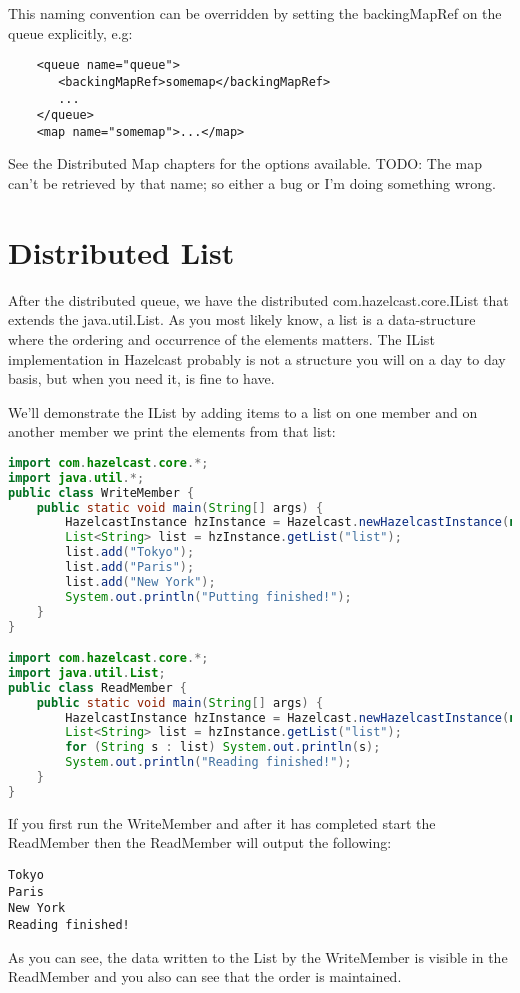 This naming convention can be overridden by setting the backingMapRef on the queue explicitly, e.g:
\begin{lstlisting}
    <queue name="queue">
       <backingMapRef>somemap</backingMapRef>
       ... 
    </queue>
    <map name="somemap">...</map>
\end{lstlisting}
See the Distributed Map chapters for the options available.
TODO: The map can't be retrieved by that name; so either a bug or I'm doing something wrong.

\section{Distributed List}
After the distributed queue, we have the distributed com.hazelcast.core.IList that extends the java.util.List. As you most likely know, a list is a data-structure where the ordering and occurrence of the elements matters. The IList implementation in Hazelcast probably is not a structure you will on a day to day basis, but when you need it, is fine to have.

We'll demonstrate the IList by adding items to a list on one member and on another member we print the elements from that list:
\begin{lstlisting}[language=java]
import com.hazelcast.core.*;
import java.util.*;
public class WriteMember {
    public static void main(String[] args) {
        HazelcastInstance hzInstance = Hazelcast.newHazelcastInstance(null);
        List<String> list = hzInstance.getList("list");
        list.add("Tokyo");
        list.add("Paris");
        list.add("New York");
        System.out.println("Putting finished!");
    }
}

import com.hazelcast.core.*;
import java.util.List;
public class ReadMember {
    public static void main(String[] args) {
        HazelcastInstance hzInstance = Hazelcast.newHazelcastInstance(null);
        List<String> list = hzInstance.getList("list");
        for (String s : list) System.out.println(s);
        System.out.println("Reading finished!");
    }
}
\end{lstlisting}
If you first run the WriteMember and after it has completed start the ReadMember then the ReadMember will output the following:
\begin{lstlisting}
Tokyo
Paris
New York
Reading finished!
\end{lstlisting}
As you can see, the data written to the List by the WriteMember is visible in the ReadMember and you also can see that the order is maintained.

